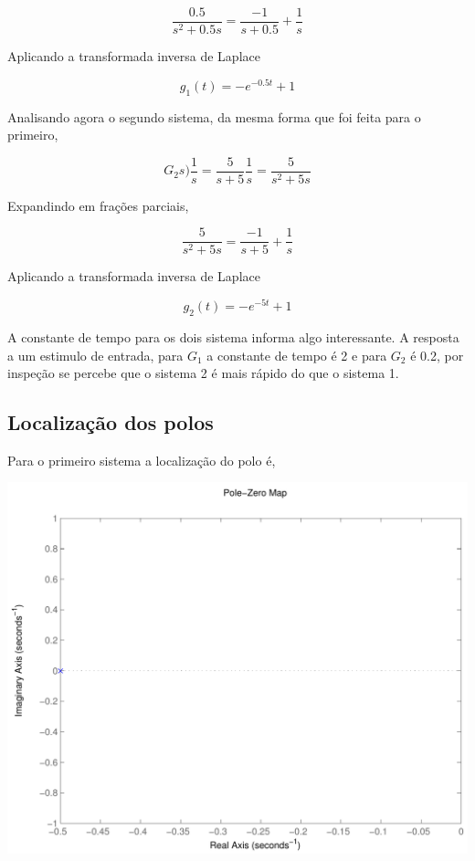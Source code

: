 \documentclass[paper=a4, fontsize=11pt]{article}
\begin{document}
\begin{equation}
    \frac{0.5}{s^2 + 0.5 s} = \frac{-1}{s+0.5} + \frac{1}{s}
\end{equation}

Aplicando a transformada inversa de Laplace

\begin{equation}
    g_1(t)=  -e^{-0.5 t} + 1
\end{equation}

Analisando agora o segundo sistema, da mesma forma que foi feita para o primeiro,

\begin{equation}
    G_2s) \frac{1}{s} = \frac{5}{s+5} \frac{1}{s} = \frac{5}{s^2 + 5 s}
\end{equation}
 
Expandindo em frações parciais,

\begin{equation}
    \frac{5}{s^2 + 5 s} = \frac{-1}{s+5} + \frac{1}{s}
\end{equation}

Aplicando a transformada inversa de Laplace

\begin{equation}
    g_2(t)=  -e^{-5 t} + 1
\end{equation}

A constante de tempo para os dois sistema informa algo interessante. A resposta
a um estimulo de entrada, para $G_1$ a constante de tempo é 2 e para $G_2$ é 
0.2, por inspeção se percebe que o sistema 2 é mais rápido do que o sistema 1.

\subsection{Localização dos polos}

Para o primeiro sistema a localização do polo é,

\begin{center}
    \includegraphics[scale=0.5]{q4pzg1.pdf}
\end{center}
\end{document}

